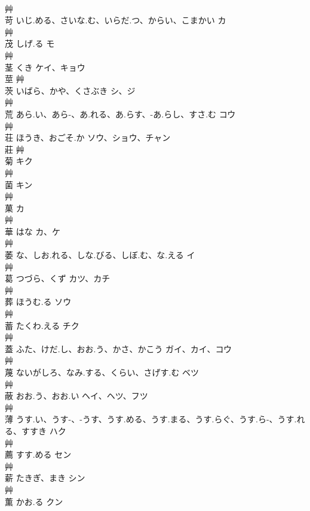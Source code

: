 \documentclass[8pt]{extreport}
\begin{document}
\begin{CJK}{UTF8}{min}
\\	艸				
\\	苛	いじ.める、さいな.む、いらだ.つ、からい、こまかい	カ	
\\	艸				
\\	茂	しげ.る	モ	
\\	艸				
\\	茎	くき	ケイ、キョウ	
\\	莖	艸				
\\	茨	いばら、かや、くさぶき	シ、ジ	
\\	艸				
\\	荒	あら.い、あら-、あ.れる、あ.らす、-あ.らし、すさ.む	コウ	
\\	艸				
\\	荘	ほうき、おごそ.か	ソウ、ショウ、チャン	
\\	莊	艸				
\\	菊		キク	
\\	艸				
\\	菌		キン	
\\	艸				
\\	菓		カ	
\\	艸				
\\	華	はな	カ、ケ	
\\	艸				
\\	萎	な、しお.れる、しな.びる、しぼ.む、な.える	イ	
\\	艸				
\\	葛	つづら、くず	カツ、カチ	
\\	艸				
\\	葬	ほうむ.る	ソウ	
\\	艸				
\\	蓄	たくわ.える	チク	
\\	艸				
\\	蓋	ふた、けだ.し、おお.う、かさ、かこう	ガイ、カイ、コウ	
\\	艸				
\\	蔑	ないがしろ、なみ.する、くらい、さげす.む	ベツ	
\\	艸				
\\	蔽	おお.う、おお.い	ヘイ、ヘツ、フツ	
\\	艸				
\\	薄	うす.い、うす-、-うす、うす.める、うす.まる、うす.らぐ、うす.ら-、うす.れる、すすき	ハク	
\\	艸				
\\	薦	すす.める	セン	
\\	艸				
\\	薪	たきぎ、まき	シン	
\\	艸				
\\	薫	かお.る	クン	

\end{CJK}
\end{document}
